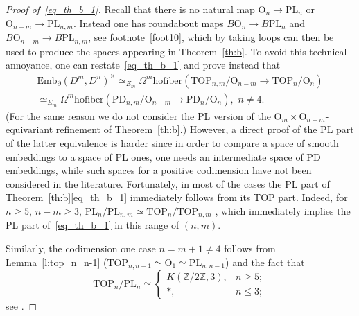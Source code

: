 \documentclass[11pt]{amsart}
\theoremstyle{definition}
\newcommand{\Z}{{\mathbb Z}}
\newcommand{\Embmn}{\mathrm{Emb}_\partial(D^m,D^n)}
\newcommand{\Embfrmn}{\mathrm{Emb}_\partial^{fr}(D^m,D^n)}
\newcommand{\PL}{\mathrm{PL}}
\newcommand{\TOP}{\mathrm{TOP}}
\newcommand{\OO}{\mathrm{O}}
\newcommand{\PD}{\mathrm{PD}}
\newcommand{\hofiber}{\mathrm{hofiber}}
\newcommand{\bbslash}{\backslash\!\!\backslash}
\numberwithin{equation}{section}
\begin{document}
\begin{proof}[Proof of~\eqref{eq_th_b_1}]
Recall that there is no natural map $\OO_n\to\PL_n$ or $\OO_{n-m}\to\PL_{n,m}$. Instead one has  roundabout maps
$B\OO_n\to B\PL_n$ and $B\OO_{n-m}\to B\PL_{n,m}$, see  footnote~\ref{foot10}, %
  which by taking loops can then be used to produce the spaces appearing in Theorem~\ref{th:b}.
 To avoid this technical annoyance, one can restate~\eqref{eq_th_b_1} %
and  prove instead that %
\begin{multline}
\Embmn^\times\simeq_{E_{m}} \Omega^m\hofiber\left(\TOP_{n,m}/\OO_{n-m}\to\TOP_n/\OO_{n}\right)\\
\simeq_{E_{m}}
\Omega^m\hofiber\left(\PD_{n,m}/\OO_{n-m}\to\PD_n/\OO_{n}\right),\,\, n\neq 4.\label{eq_th_b_1'}
\end{multline}
(For the same reason we do not consider the PL version of the $\OO_m\times\OO_{n-m}$-equivariant refinement of Theorem~\ref{th:b}.)
 However, a direct proof of the PL part of the latter equivalence is harder 
since in order to compare a space of smooth embeddings to a space of PL ones, one needs an intermediate space of PD embeddings, while such spaces for a positive codimension have not been considered  in the literature.
 Fortunately, in most of the cases the PL part of Theorem~\ref{th:b}\eqref{eq_th_b_1} immediately follows from its TOP part. Indeed, for $n\geq 5$, $n-m\geq 3$, $\PL_n/\PL_{n,m}
\simeq \TOP_n/\TOP_{n,m}$ \cite[Proposition~$(t/pl)$]{Lashof}, which immediately implies the PL part of~\eqref{eq_th_b_1} %
in this range of $(n,m)$.

Similarly, the codimension one case $n=m+1\neq 4$ follows from Lemma~\ref{l:top_n_n-1} ($\TOP_{n,n-1}\simeq \OO_1\simeq\PL_{n,n-1}$) and the fact that 
$$
\TOP_n/\PL_n
\simeq\begin{cases} K(\Z/2\Z,3),& n\geq 5;\\
*,& n\leq 3;
\end{cases}
$$
 see \cite[Essay~V, \S5, Subsection~5.0]{KS_essays}.


\end{proof}
\end{document}
